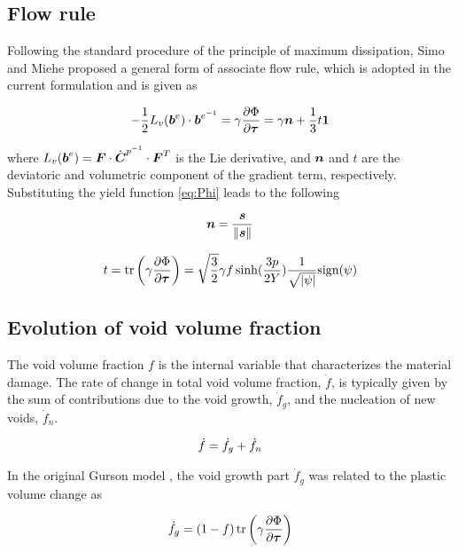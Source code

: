 \subsection{Flow rule}
Following the standard procedure of the principle of maximum
dissipation, Simo and Miehe \cite{Simo1992} proposed a general form of
associate flow rule, which is adopted in the current formulation and
is given as

\begin{equation}\label{eq:flowRule}
-\frac{1}{2}L_v({\boldsymbol{b}}^e)\cdot{\boldsymbol{b}}^{e^{-1}} =
\gamma\frac{\partial\Phi}{\partial{\boldsymbol{\tau}}}=\gamma{\boldsymbol{n}} +
\frac{1}{3}t\boldsymbol{1}
\end{equation}

where $L_v({\boldsymbol{b}}^e)={\boldsymbol{F}} \cdot \dot{{\boldsymbol{C}}}^{p^{-1}} \cdot {\boldsymbol{F}}^T$ is the Lie
derivative, and ${\boldsymbol{n}}$ and $t$ are the deviatoric and volumetric
component of the gradient term, respectively. Substituting the yield
function \eqref{eq:Phi} leads to the following

\begin{equation}\label{eq:n}
{\boldsymbol{n}} = \frac{{\boldsymbol{s}}}{\|{\boldsymbol{s}}\|}
\end{equation}

\begin{equation}\label{eq:t}
t = \operatorname{\text{tr}} \left( \gamma \frac{\partial\Phi}{\partial{\boldsymbol{\tau}}}\right) =
\sqrt{\frac{3}{2}}\gamma f \sinh (\frac{3p}{2
  Y})\frac{1}{\sqrt{|\psi|}} {\rm sign}(\psi)
\end{equation}

\subsection{Evolution of void volume fraction}
The void volume fraction $f$ is the internal variable that
characterizes the material damage. The rate of change in total void
volume fraction, $\dot{f}$, is typically given by the sum of
contributions due to the void growth, $\dot{f}_g$, and the nucleation
of new voids, $\dot{f}_{n}$.

\begin{equation}\label{eq:dotf}
\dot{f} = \dot{f}_g + \dot{f}_{n}\\
\end{equation}

In the original Gurson model \cite{Gurson1977}, the void growth part
$\dot{f}_g$ was related to the plastic volume change as

\begin{equation}\label{eq:fg_orig}
\dot{f}_g = (1-f)\operatorname{\text{tr}}\left( \gamma\frac{\partial\Phi}{\partial{\boldsymbol{\tau}}}
\right)
\end{equation}

